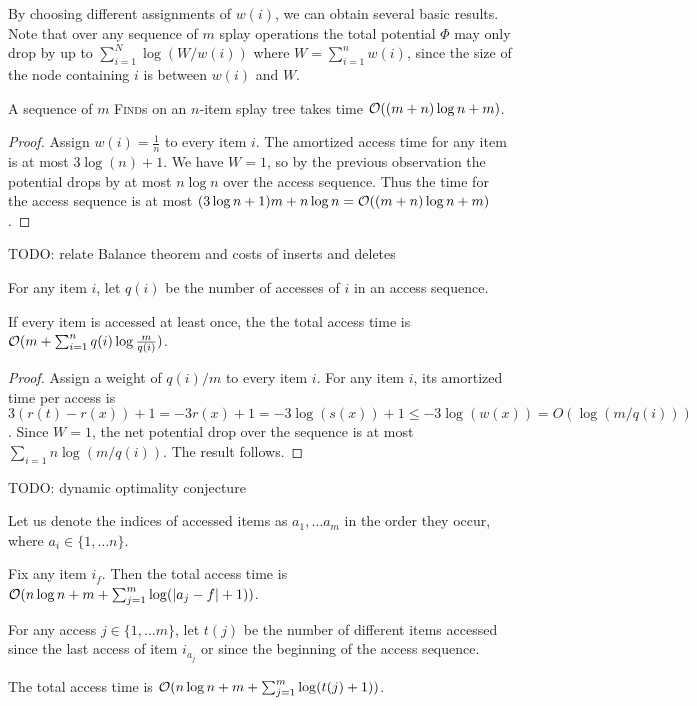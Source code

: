 By choosing different assignments of $w(i)$, we can obtain several basic
results. Note that over any sequence of $m$ splay operations
the total potential $\Phi$ may only drop by up to $\sum_{i=1}^N \log(W/w(i))$
where $W=\sum_{i=1}^n w(i)$, since the size of the node containing $i$
is between $w(i)$ and $W$.

\begin{theorem}
A sequence of $m$ \textsc{Find}s on an $n$-item splay tree takes time
$\mathcal{O}((m+n)\log n+m)$.
\end{theorem}
\begin{proof}
Assign $w(i) = \frac{1}{n}$ to every item $i$. The amortized
access time for any item is at most $3\log(n)+1$. We have $W=1$, so by
the previous observation the potential drops by at most $n\log n$ over
the access sequence. Thus the time for the access sequence is at most
$(3\log n+1)m + n\log n = \mathcal{O}((m+n)\log n + m)$.
\end{proof}

TODO: relate Balance theorem and costs of inserts and deletes

For any item $i$, let $q(i)$ be the number of accesses of $i$ in an access
sequence.
\begin{theorem}
If every item is accessed at least once, the the total access time is
$\mathcal{O}(m + \sum_{i=1}^n q(i)\log\frac{m}{q(i)})$.
\end{theorem}
\begin{proof}
Assign a weight of $q(i)/m$ to every item $i$. For any item $i$, its
amortized time per access is $3(r(t)-r(x))+1=-3r(x)+1=-3\log(s(x))+1\leq
	-3\log(w(x))=O(\log(m/q(i)))$.
Since $W=1$, the net potential drop over the sequence is at most
$\sum_{i=1}{n}\log(m/q(i))$. The result follows.
\end{proof}

TODO: dynamic optimality conjecture

Let us denote the indices of accessed items as $a_1, \ldots a_m$
in the order they occur, where $a_i \in \{1,\ldots n\}$.

\begin{theorem}
Fix any item $i_f$. Then the total access time is $\mathcal{O}(n\log n + m +
\sum_{j=1}^m \log(|a_j-f|+1))$.
\end{theorem}

For any access $j\in\{1,\ldots m\}$, let $t(j)$ be the number of different
items accessed since the last access of item $i_{a_j}$ or since the
beginning of the access sequence.
\begin{theorem}
The total access time is $\mathcal{O}(n\log n + m + \sum_{j=1}^m\log(t(j)+1))$.
\end{theorem}

